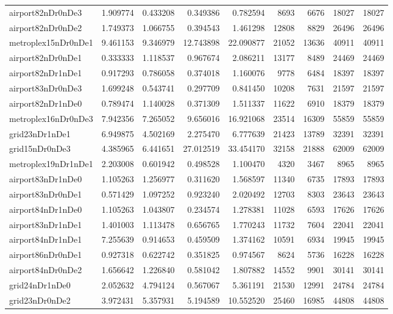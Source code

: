 \begin{longtable}{|l|r|r|r|r|r|r|r|r|}
airport82nDr0nDe3 & 1.909774 & 0.433208 & 0.349386 & 0.782594 & 8693 & 6676 & 18027 & 18027 \\
airport82nDr0nDe2 & 1.749373 & 1.066755 & 0.394543 & 1.461298 & 12808 & 8829 & 26496 & 26496 \\
metroplex15nDr0nDe1 & 9.461153 & 9.346979 & 12.743898 & 22.090877 & 21052 & 13636 & 40911 & 40911 \\
airport82nDr0nDe1 & 0.333333 & 1.118537 & 0.967674 & 2.086211 & 13177 & 8489 & 24469 & 24469 \\
airport82nDr1nDe1 & 0.917293 & 0.786058 & 0.374018 & 1.160076 & 9778 & 6484 & 18397 & 18397 \\
airport83nDr0nDe3 & 1.699248 & 0.543741 & 0.297709 & 0.841450 & 10208 & 7631 & 21597 & 21597 \\
airport82nDr1nDe0 & 0.789474 & 1.140028 & 0.371309 & 1.511337 & 11622 & 6910 & 18379 & 18379 \\
metroplex16nDr0nDe3 & 7.942356 & 7.265052 & 9.656016 & 16.921068 & 23514 & 16309 & 55859 & 55859 \\
grid23nDr1nDe1 & 6.949875 & 4.502169 & 2.275470 & 6.777639 & 21423 & 13789 & 32391 & 32391 \\
grid15nDr0nDe3 & 4.385965 & 6.441651 & 27.012519 & 33.454170 & 32158 & 21888 & 62009 & 62009 \\
metroplex19nDr1nDe1 & 2.203008 & 0.601942 & 0.498528 & 1.100470 & 4320 & 3467 & 8965 & 8965 \\
airport83nDr1nDe0 & 1.105263 & 1.256977 & 0.311620 & 1.568597 & 11340 & 6735 & 17893 & 17893 \\
airport83nDr0nDe1 & 0.571429 & 1.097252 & 0.923240 & 2.020492 & 12703 & 8303 & 23643 & 23643 \\
airport84nDr1nDe0 & 1.105263 & 1.043807 & 0.234574 & 1.278381 & 11028 & 6593 & 17626 & 17626 \\
airport83nDr1nDe1 & 1.401003 & 1.113478 & 0.656765 & 1.770243 & 11732 & 7604 & 22041 & 22041 \\
airport84nDr1nDe1 & 7.255639 & 0.914653 & 0.459509 & 1.374162 & 10591 & 6934 & 19945 & 19945 \\
airport86nDr0nDe1 & 0.927318 & 0.622742 & 0.351825 & 0.974567 & 8624 & 5736 & 16228 & 16228 \\
airport84nDr0nDe2 & 1.656642 & 1.226840 & 0.581042 & 1.807882 & 14552 & 9901 & 30141 & 30141 \\
grid24nDr1nDe0 & 2.052632 & 4.794124 & 0.567067 & 5.361191 & 21530 & 12991 & 24784 & 24784 \\
grid23nDr0nDe2 & 3.972431 & 5.357931 & 5.194589 & 10.552520 & 25460 & 16985 & 44808 & 44808 \\

\end{longtable}
